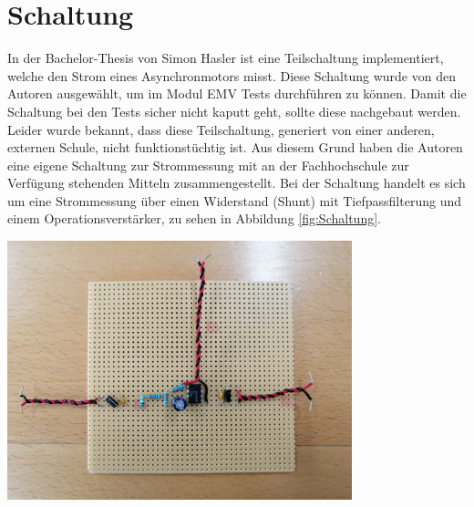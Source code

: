 \section{Schaltung}
\label{sec:Schaltung}


In der Bachelor-Thesis von Simon Hasler ist eine Teilschaltung implementiert, welche den Strom eines Asynchronmotors misst. Diese Schaltung wurde von den Autoren ausgewählt, um im Modul EMV Tests durchführen zu können. Damit die Schaltung bei den Tests sicher nicht kaputt geht, sollte diese nachgebaut werden. Leider wurde bekannt, dass diese Teilschaltung, generiert von einer anderen, externen Schule, nicht funktionstüchtig ist. Aus diesem Grund haben die Autoren eine eigene Schaltung zur Strommessung mit an der Fachhochschule zur Verfügung stehenden Mitteln zusammengestellt. Bei der Schaltung handelt es sich um eine Strommessung über einen Widerstand (Shunt) mit Tiefpassfilterung und einem Operationsverstärker, zu sehen in Abbildung \ref{fig:Schaltung}.

\begin{minipage}[b][6cm][t]{1\textwidth}
\centering
\includegraphics[angle=90,width=0.75\textwidth]{graphics/Schaltung.jpg}
\label{fig:Schaltung}
\end{minipage}

